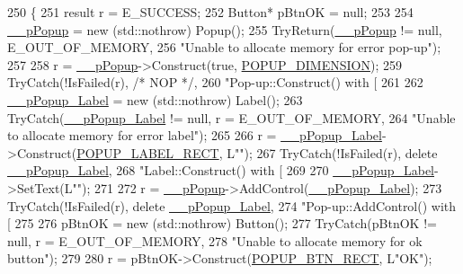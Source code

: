 \begin{DoxyCode}
250                                          \{
251     result r = E\_SUCCESS;
252     Button* pBtnOK = null;
253 
254     \hyperlink{class_calculator_form_aa22a98e80f0533746ca5c712ea3b7a8e}{\_\_pPopup} = \textcolor{keyword}{new} (std::nothrow) Popup();
255     TryReturn(\hyperlink{class_calculator_form_aa22a98e80f0533746ca5c712ea3b7a8e}{\_\_pPopup} != null, E\_OUT\_OF\_MEMORY,
256             \textcolor{stringliteral}{"Unable to allocate memory for error pop-up"});
257 
258     r = \hyperlink{class_calculator_form_aa22a98e80f0533746ca5c712ea3b7a8e}{\_\_pPopup}->Construct(\textcolor{keyword}{true}, \hyperlink{_calculator_form_8cpp_a3efdfa9e0e3df2363389bb8cc1fbb4ac}{POPUP\_DIMENSION});
259     TryCatch(!IsFailed(r), \textcolor{comment}{/* NOP */},
260             \textcolor{stringliteral}{"Pop-up::Construct() with [%
261 
262     \hyperlink{class_calculator_form_aabf0dd69d2567ee96db776f4bbe53f4e}{\_\_pPopup\_Label} = \textcolor{keyword}{new} (std::nothrow) Label();
263     TryCatch(\hyperlink{class_calculator_form_aabf0dd69d2567ee96db776f4bbe53f4e}{\_\_pPopup\_Label} != null, r = E\_OUT\_OF\_MEMORY,
264     \textcolor{stringliteral}{"Unable to allocate memory for error label"});
265 
266     r = \hyperlink{class_calculator_form_aabf0dd69d2567ee96db776f4bbe53f4e}{\_\_pPopup\_Label}->Construct(\hyperlink{_calculator_form_8cpp_a71dcdf817688131706205d3b70932daa}{POPUP\_LABEL\_RECT}, L\textcolor{stringliteral}{""});
267     TryCatch(!IsFailed(r), \textcolor{keyword}{delete} \hyperlink{class_calculator_form_aabf0dd69d2567ee96db776f4bbe53f4e}{\_\_pPopup\_Label},
268             \textcolor{stringliteral}{"Label::Construct() with [%
269 
270     \hyperlink{class_calculator_form_aabf0dd69d2567ee96db776f4bbe53f4e}{\_\_pPopup\_Label}->SetText(L\textcolor{stringliteral}{""});
271 
272     r = \hyperlink{class_calculator_form_aa22a98e80f0533746ca5c712ea3b7a8e}{\_\_pPopup}->AddControl(\hyperlink{class_calculator_form_aabf0dd69d2567ee96db776f4bbe53f4e}{\_\_pPopup\_Label});
273     TryCatch(!IsFailed(r), \textcolor{keyword}{delete} \hyperlink{class_calculator_form_aabf0dd69d2567ee96db776f4bbe53f4e}{\_\_pPopup\_Label},
274             \textcolor{stringliteral}{"Pop-up::AddControl() with [%
275 
276     pBtnOK = \textcolor{keyword}{new} (std::nothrow) Button();
277     TryCatch(pBtnOK != null, r = E\_OUT\_OF\_MEMORY,
278     \textcolor{stringliteral}{"Unable to allocate memory for ok button"});
279 
280     r = pBtnOK->Construct(\hyperlink{_calculator_form_8cpp_a74c6359e95c3c71ca337eba85c026a3f}{POPUP\_BTN\_RECT}, L\textcolor{stringliteral}{"OK"});
}}}
\end{DoxyCode}
